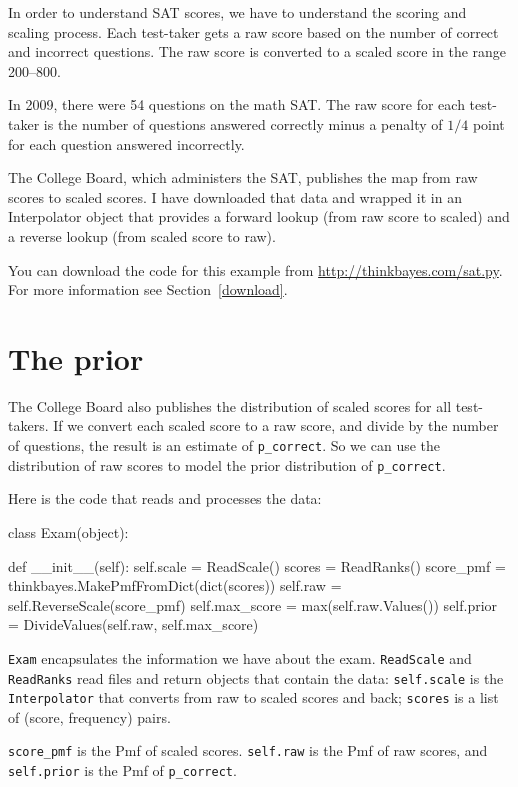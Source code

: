 \documentclass[12pt]{book}
\theoremstyle{exercise}
\begin{document}
In order to understand SAT scores, we have to understand the scoring
and scaling process.  Each test-taker gets a raw score based on the
number of correct and incorrect questions.  The raw score is converted
to a scaled score in the range 200--800.

In 2009, there were 54 questions on the math SAT.  The raw score
for each test-taker is the number of questions answered correctly
minus a penalty of $1/4$ point for each question answered incorrectly.

The College Board, which administers the SAT, publishes the
map from raw scores to scaled scores.  I have downloaded that
data and wrapped it in an Interpolator object that provides a forward
lookup (from raw score to scaled) and a reverse lookup (from scaled
score to raw).

You can download the code for this example from
\url{http://thinkbayes.com/sat.py}.
  For more information
see Section~\ref{download}.

\section{The prior}

The College Board also publishes the distribution of scaled scores
for all test-takers.  If we convert each scaled score to a raw score,
and divide by the number of questions, the result is an estimate
of \verb"p_correct".
So we can use the distribution of raw scores to model the
prior distribution of \verb"p_correct".

Here is the code that reads and processes the data:

\begin{code}
class Exam(object):

    def __init__(self):
        self.scale = ReadScale()
        scores = ReadRanks()
        score_pmf = thinkbayes.MakePmfFromDict(dict(scores))
        self.raw = self.ReverseScale(score_pmf)
        self.max_score = max(self.raw.Values())
        self.prior = DivideValues(self.raw, self.max_score)
\end{code}

{\tt Exam} encapsulates the information we have about the exam.
{\tt ReadScale} and {\tt ReadRanks} read files and return
objects that contain the data:
{\tt self.scale} is the {\tt Interpolator} that converts
from raw to scaled scores and back;  {\tt scores} is a list
of (score, frequency) pairs.

\verb"score_pmf" is the Pmf of
scaled scores.   {\tt self.raw} is the Pmf of raw scores, and
{\tt self.prior} is the Pmf of \verb"p_correct".
\end{document}
